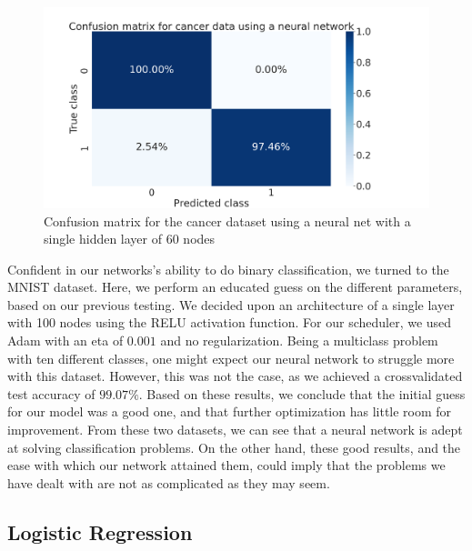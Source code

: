 \documentclass[onecolumn,10pt,cleanfoot]{asme2ej}
\begin{document}
\begin{figure}[h]
\centerline{\includegraphics[width=5in]{figure/conf_mat_NN_cancer.png}}
\caption{Confusion matrix for the cancer dataset using a neural net with a single hidden layer of 60 nodes}
\label{cancerconf}
\end{figure}

Confident in our networks's ability to do binary classification, we turned to the MNIST dataset. Here, we perform an educated guess on the different parameters, based on our previous testing. We decided upon an architecture of a single layer with 100 nodes using the RELU activation function. For our scheduler, we used Adam with an eta of $0.001$ and no regularization. Being a multiclass problem with ten different classes, one might expect our neural network to struggle more with this dataset. However, this was not the case, as we achieved a crossvalidated test accuracy of $99.07\%$. Based on these results, we conclude that the initial guess for our model was a good one, and that further optimization has little room for improvement. From these two datasets, we can see that a neural network is adept at solving classification problems. On the other hand, these good results, and the ease with which our network attained them, could imply that the problems we have dealt with are not as complicated as they may seem.

\subsection{Logistic Regression}
\end{document}

